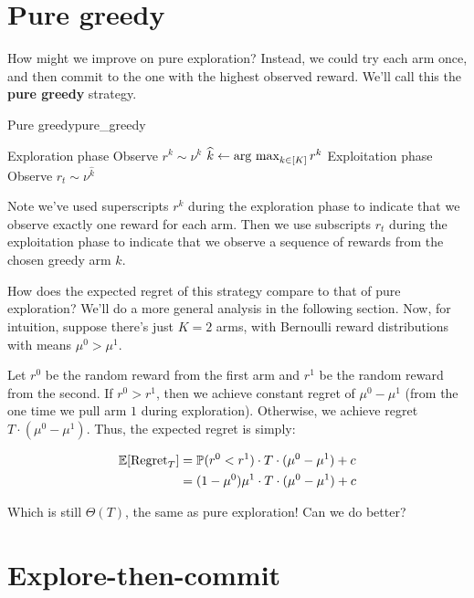 \documentclass[\main/main]{subfiles}
\begin{document}
\section{Pure greedy}

How might we improve on pure exploration? Instead, we could try each arm once, and then commit to the one with the highest observed reward. We'll call this the \textbf{pure greedy} strategy.

\begin{definition}{Pure greedy}{pure_greedy}
    \begin{algorithmic}
        \Comment Exploration phase
        \State Observe $r^k \sim \nu^k$
        \EndFor
        \State $\widehat k \gets \operatorname*{\textrm{arg\ max}}_{k \in [K]} r^k$
        \Comment Exploitation phase
        \State Observe $r_t \sim \nu^{\hat k}$
        \EndFor
    \end{algorithmic}
    Note we've used superscripts $r^k$ during the exploration phase to indicate that we observe exactly one reward for each arm. Then we use subscripts $r_t$ during the exploitation phase to indicate that we observe a sequence of rewards from the chosen greedy arm $\hat k$.
\end{definition}

How does the expected regret of this strategy compare to that of pure exploration? We'll do a more general analysis in the following section. Now, for intuition, suppose there's just $K=2$ arms, with Bernoulli reward distributions with means $\mu^0 > \mu^1$.

Let $r^0$ be the random reward from the first arm and $r^1$ be the random reward from the second. If $r^0 > r^1$, then we achieve constant regret of $\mu^0 - \mu^1$ (from the one time we pull arm $1$ during exploration). Otherwise, we achieve regret $T\cdot (\mu^0 - \mu^1)$. Thus, the expected regret is simply:

\begin{align*}
    \operatorname*{\mathbb{E}}[\text{Regret}_T] & = \operatorname*{\mathbb{P}}(r^0 < r^1) \cdot T \cdot (\mu^0 - \mu^1) + c     \\
                        & = (1 - \mu^0) \mu^1 \cdot T \cdot (\mu^0 - \mu^1) + c
\end{align*}

Which is still $\Theta(T)$, the same as pure exploration! Can we do better?

\section{Explore-then-commit}
\end{document}
